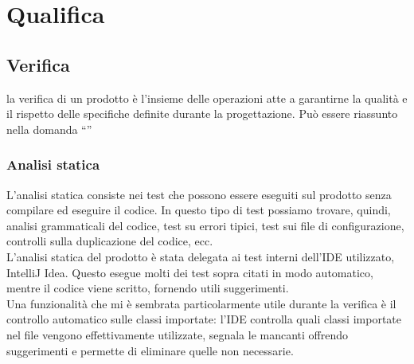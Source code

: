 \section{Qualifica}
	\subsection{Verifica}
	la verifica di un prodotto è l'insieme delle operazioni atte a garantirne la qualità e il rispetto delle specifiche definite durante la progettazione. Può essere riassunto nella domanda ``''
		\subsubsection{Analisi statica}
		L'analisi statica consiste nei test che possono essere eseguiti sul prodotto senza compilare ed eseguire il codice. In questo tipo di test possiamo trovare, quindi, analisi grammaticali del codice, test su errori tipici, test sui file di configurazione, controlli sulla duplicazione del codice, ecc.
		\\
		L'analisi statica del prodotto è stata delegata ai test interni dell'IDE utilizzato, IntelliJ Idea. Questo esegue molti dei test sopra citati in modo automatico, mentre il codice viene scritto, fornendo utili suggerimenti.
		\\
		Una funzionalità che mi è sembrata particolarmente utile durante la verifica è il controllo automatico sulle classi importate: l'IDE controlla quali classi importate nel file vengono effettivamente utilizzate, segnala le mancanti offrendo suggerimenti e permette di eliminare quelle non necessarie.

